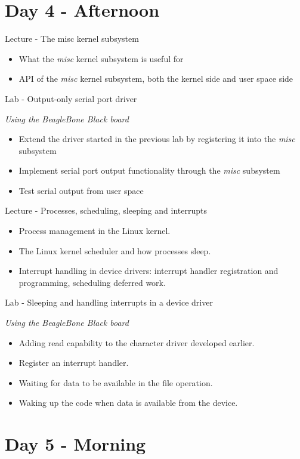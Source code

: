 \documentclass[a4paper,12pt,obeyspaces,spaces,hyphens]{article}
\begin{document}
\section{Day 4 - Afternoon}

\feagendatwocolumn
{Lecture - The misc kernel subsystem}
{
  \begin{itemize}
  \item What the {\em misc} kernel subsystem is useful for
  \item API of the {\em misc} kernel subsystem, both the kernel side
    and user space side
  \end{itemize}
}
{Lab - Output-only serial port driver}
{
  {\em Using the BeagleBone Black board}
  \begin{itemize}
  \item Extend the driver started in the previous lab by registering
    it into the {\em misc} subsystem
  \item Implement serial port output functionality through the {\em
      misc} subsystem
  \item Test serial output from user space
  \end{itemize}
}

\feagendatwocolumn
{Lecture - Processes, scheduling, sleeping and interrupts}
{
  \begin{itemize}
  \item Process management in the Linux kernel.
  \item The Linux kernel scheduler and how processes sleep.
  \item Interrupt handling in device drivers: interrupt handler
    registration and programming, scheduling deferred work.
  \end{itemize}
}
{Lab - Sleeping and handling interrupts in a device driver}
{
  {\em Using the BeagleBone Black board}
  \begin{itemize}
  \item Adding read capability to the character driver developed
    earlier.
  \item Register an interrupt handler.
  \item Waiting for data to be available in the  file operation.
  \item Waking up the code when data is available from the device.
  \end{itemize}
}

\section{Day 5 - Morning}
\end{document}
